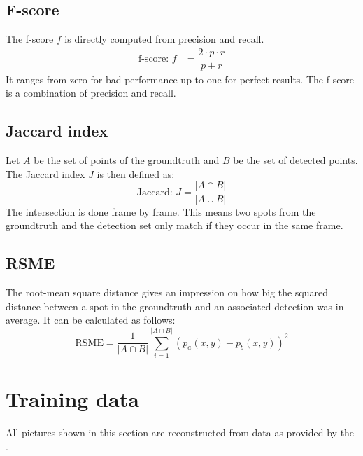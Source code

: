\subsection*{F-score}
The f-score $f$ is directly computed from precision and recall.
\begin{eqnarray}
	\text{f-score: }f &=\dfrac{2\cdot p \cdot r}{p+r} 
\end{eqnarray}
It ranges from zero for bad performance up to one for perfect results. The f-score is a combination of precision and recall.
\subsection*{Jaccard index}
Let $A$ be the set of points of the groundtruth and $B$ be the set of detected points. The Jaccard index $J$ is then defined as:
\begin{equation}
\text{Jaccard: }J = \frac{\left|A\cap B\right|}{\left|A\cup B\right|}
\end{equation}
The intersection is done frame by frame. This means two spots from the groundtruth and the detection set only match if they occur in the same frame. 
\subsection*{RSME}
The root-mean square distance gives an impression on how big the squared distance between a spot in the groundtruth and an associated detection was in average. It can be calculated as follows:
\begin{equation}
\text{RSME} = \frac{1}{\left|A\cap B\right|}\sum\limits_{i=1}^{\left|A\cap B\right|} \left(p_a(x,y)-p_b(x,y)\right)^2
\end{equation}
\section{Training data}
All pictures shown in this section are reconstructed from data as provided by the \cite{challenge}.
